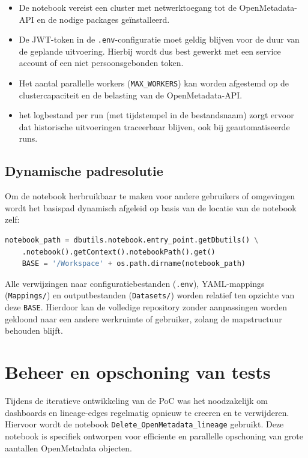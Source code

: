 \begin{itemize}
	\item De notebook vereist een cluster met netwerktoegang tot de OpenMetadata-API en de nodige packages geïnstalleerd.
	\item De JWT-token in de \texttt{.env}-configuratie moet geldig blijven voor de duur van de geplande uitvoering. Hierbij wordt dus best gewerkt met een service account of een niet persoonsgebonden token.
	\item Het aantal parallelle workers (\texttt{MAX\_WORKERS}) kan worden afgestemd op de clustercapaciteit en de belasting van de OpenMetadata-API.
	\item het logbestand per run (met tijdstempel in de bestandsnaam) zorgt ervoor dat historische uitvoeringen traceerbaar blijven, ook bij geautomatiseerde runs.
\end{itemize}

\subsection{Dynamische padresolutie}

Om de notebook herbruikbaar te maken voor andere gebruikers of omgevingen wordt het basispad dynamisch afgeleid op basis van de locatie van de notebook zelf:

\begin{lstlisting}[language=python, caption={Dynamische padresolutie}, label={lst:dynamic-base}]
	notebook_path = dbutils.notebook.entry_point.getDbutils() \
	.notebook().getContext().notebookPath().get()
	BASE = '/Workspace' + os.path.dirname(notebook_path)
\end{lstlisting}

Alle verwijzingen naar configuratiebestanden (\texttt{.env}), YAML-mappings (\texttt{Mappings/}) en outputbestanden (\texttt{Datasets/}) worden relatief ten opzichte van deze \texttt{BASE}. Hierdoor kan de volledige repository zonder aanpassingen worden gekloond naar een andere werkruimte of gebruiker, zolang de mapstructuur behouden blijft.\\

\section{Beheer en opschoning van tests}

Tijdens de iteratieve ontwikkeling van de PoC was het noodzakelijk om dashboards en lineage-edges regelmatig opnieuw te creeren en te verwijderen. Hiervoor wordt de notebook \texttt{Delete\_OpenMetadata\_lineage} gebruikt. Deze notebook is specifiek ontworpen voor efficiente en parallelle opschoning van grote aantallen OpenMetadata objecten.\\

